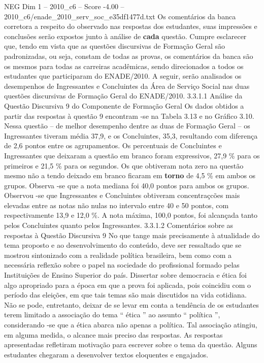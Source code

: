 \begin{textsample}{NEG Dim 1 – 2010\_c6 – Score -4.00 – 2010\_c6/enade\_2010\_serv\_soc\_e35df1477d.txt}
Os comentários da banca corretora a respeito do observado nas respostas dos estudantes, suas impressões e conclusões serão expostos junto à análise de \textbf{cada} questão.
Cumpre esclarecer que, tendo em vista que as questões discursivas de Formação Geral são padronizadas, ou seja, constam de todas as provas, os comentários da banca são os mesmos para todas as carreiras acadêmicas, sendo direcionados a todos os estudantes que participaram do ENADE/2010.
A seguir, serão analisados os desempenhos de Ingressantes e Concluintes da Área de Serviço Social nas duas questões discursivas de Formação Geral do ENADE/2010. 3.3.1.1 Análise da Questão Discursiva 9 do Componente de Formação Geral Os dados obtidos a partir das respostas à questão 9 encontram -se na Tabela 3.13 e no Gráfico 3.10.
Nessa questão – de melhor desempenho dentre as duas de Formação Geral – os Ingressantes tiveram média 37,9, e os Concluintes, 35,3, resultando com diferença de 2,6 pontos entre os agrupamentos.
Os percentuais de Concluintes e Ingressantes que deixaram a questão em branco foram expressivos, 27,9 \% para os primeiros e 21,5 \% para os segundos.
Os que obtiveram nota zero na questão mesmo não a tendo deixado em branco ficaram em \textbf{torno} de 4,5 \% em ambos os grupos.
Observa -se que a nota mediana foi 40,0 pontos para ambos os grupos.
Observou -se que Ingressantes e Concluintes obtiveram concentraçcões mais elevadas entre as notas não nulas no intervalo entre 40 e 50 pontos, com respectivamente 13,9 e 12,0 \%.
A nota máxima, 100,0 pontos, foi alcançada tanto pelos Concluintes quanto pelos Ingressantes. 3.3.1.2 Comentários sobre as respostas à Questão Discursiva 9 No que tange mais precisamente à atualidade do tema proposto e ao desenvolvimento do conteúdo, deve ser ressaltado que se mostrou sintonizado com a realidade política brasileira, bem como com a necessária reflexão sobre o papel na sociedade do profissional formado pelas Instituições de Ensino Superior do país.
Dissertar sobre democracia e ética foi algo apropriado para a época em que a prova foi aplicada, pois coincidiu com o período das eleições, em que tais temas são mais discutidos na vida cotidiana.
Não se pode, entretanto, deixar de se levar em conta a tendência de os estudantes terem limitado a associação do tema “ ética ” ao assunto “ política ”, considerando -se que a ética abarca não apenas a política.
Tal associação atingiu, em alguma medida, o alcance mais preciso das respostas.
As respostas apresentadas refletiram motivação para escrever sobre o tema da questão.
Alguns estudantes chegaram a desenvolver textos eloquentes e engajados.

\end{textsample}
